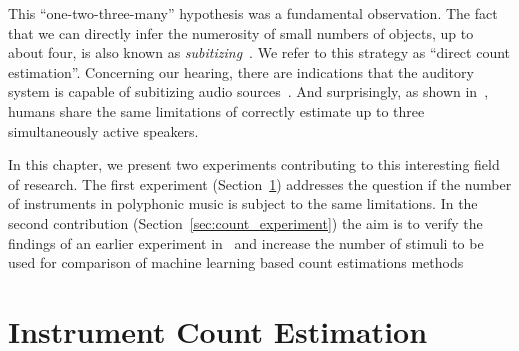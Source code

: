 This ``one-two-three-many'' hypothesis was a fundamental observation.
The fact that we can directly infer the numerosity of small numbers of objects, up to about four, is also known as \emph{subitizing}~\cite{kaufman49, burr10}. We refer to this strategy as ``direct count estimation''.
Concerning our hearing, there are indications that the auditory system is capable of subitizing audio sources~\cite{hoopen79}.
And surprisingly, as shown in~\cite{kashino96, kawashima15}, humans share the same limitations of correctly estimate up to three simultaneously active speakers.
\par
In this chapter, we present two experiments contributing to this interesting field of research.
The first experiment (Section~\ref{sec:ismir}) addresses the question if the number of instruments in polyphonic music is subject to the same limitations.
In the second contribution (Section~\ref{sec:count_experiment}) the aim is to verify the findings of an earlier experiment in~\cite{kawashima15} and increase the number of stimuli to be used for comparison of machine learning based count estimations methods

\section{Instrument Count Estimation}%
\label{sec:ismir}


